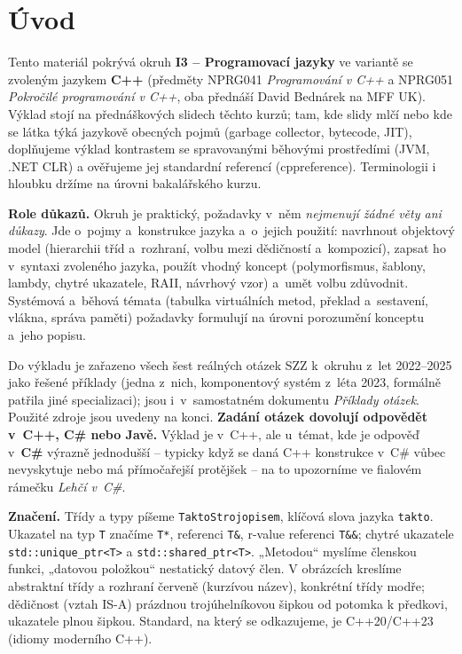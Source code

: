\documentclass[11pt,a4paper]{article}
\newcommand{\cd}{\lstinline[style=cpp]}
\begin{document}
\maketitle
\tableofcontents
\bigskip

\section*{Úvod}

Tento materiál pokrývá okruh \textbf{I3 -- Programovací jazyky} ve variantě se zvoleným jazykem \textbf{C++} (předměty NPRG041 \emph{Programování v C++} a NPRG051 \emph{Pokročilé programování v C++}, oba přednáší David Bednárek na MFF UK). Výklad stojí na přednáškových slidech těchto kurzů; tam, kde slidy mlčí nebo kde se látka týká jazykově obecných pojmů (garbage collector, bytecode, JIT), doplňujeme výklad kontrastem se spravovanými běhovými prostředími (JVM, .NET CLR) a ověřujeme jej standardní referencí (cppreference). Terminologii i hloubku držíme na úrovni bakalářského kurzu.

\noindent\textbf{Role důkazů.} Okruh je praktický, požadavky v~něm \emph{nejmenují žádné věty ani důkazy}. Jde o~pojmy a~konstrukce jazyka a~o~jejich použití: navrhnout objektový model (hierarchii tříd a~rozhraní, volbu mezi dědičností a~kompozicí), zapsat ho v~syntaxi zvoleného jazyka, použít vhodný koncept (polymorfismus, šablony, lambdy, chytré ukazatele, RAII, návrhový vzor) a~umět volbu zdůvodnit. Systémová a~běhová témata (tabulka virtuálních metod, překlad a~sestavení, vlákna, správa paměti) požadavky formulují na úrovni porozumění konceptu a~jeho popisu.

Do výkladu je zařazeno všech šest reálných otázek SZZ k~okruhu z~let 2022--2025 jako řešené příklady (jedna z~nich, komponentový systém z~léta 2023, formálně patřila jiné specializaci); jsou i~v~samostatném dokumentu \emph{Příklady otázek}. Použité zdroje jsou uvedeny na konci. \textbf{Zadání otázek dovolují odpovědět v~C++, C\# nebo Javě.} Výklad je v~C++, ale u~témat, kde je odpověď v~\textbf{C\#} výrazně jednodušší -- typicky když se daná C++ konstrukce v~C\# vůbec nevyskytuje nebo má přímočařejší protějšek -- na to upozorníme ve fialovém rámečku \emph{Lehčí v~C\#}.

\medskip
\noindent\textbf{Značení.} Třídy a typy píšeme \texttt{TaktoStrojopisem}, klíčová slova jazyka \cd{takto}. Ukazatel na typ \texttt{T} značíme \cd{T*}, referenci \cd{T&}, r-value referenci \cd{T&&}; chytré ukazatele \cd{std::unique_ptr<T>} a \cd{std::shared_ptr<T>}. „Metodou`` myslíme členskou funkci, „datovou položkou`` nestatický datový člen. V obrázcích kreslíme abstraktní třídy a rozhraní červeně (kurzívou název), konkrétní třídy modře; dědičnost (vztah IS-A) prázdnou trojúhelníkovou šipkou od potomka k předkovi, ukazatele plnou šipkou. Standard, na který se odkazujeme, je C++20/C++23 (idiomy moderního C++).
\end{document}
